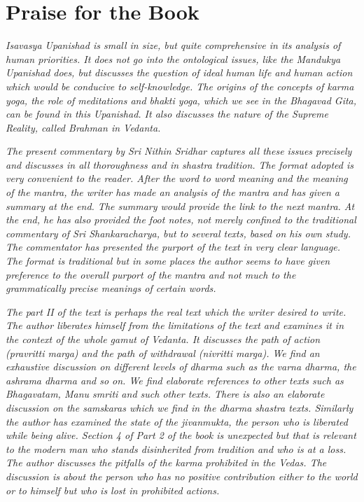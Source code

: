 \chapter{Praise for the Book}

\emph{Isavasya Upanishad is small in size, but quite comprehensive in its analysis of human priorities. It does not go into the ontological issues, like the Mandukya Upanishad does, but discusses the question of ideal human life and human action which would be conducive to self-knowledge. The origins of the concepts of karma yoga, the role of meditations and bhakti yoga, which we see in the Bhagavad Gita, can be found in this Upanishad. It also discusses the nature of the Supreme Reality, called Brahman in Vedanta.}

\emph{The present commentary by Sri Nithin Sridhar captures all these issues precisely and discusses in all thoroughness and in shastra tradition. The format adopted is very convenient to the reader. After the word to word meaning and the meaning of the mantra, the writer has made an analysis of the mantra and has given a summary at the end. The summary would provide the link to the next mantra. At the end, he has also provided the foot notes, not merely confined to the traditional commentary of Sri Shankaracharya, but to several texts, based on his own study. The commentator has presented the purport of the text in very clear language. The format is traditional but in some places the author seems to have given preference to the overall purport of the mantra and not much to the grammatically precise meanings of certain words.}

\emph{The part II of the text is perhaps the real text which the writer desired to write. The author liberates himself from the limitations of the text and examines it in the context of the whole gamut of Vedanta. It discusses the path of action (pravritti marga) and the path of withdrawal (nivritti marga). We find an exhaustive discussion on different levels of dharma such as the varna dharma, the ashrama dharma and so on. We find elaborate references to other texts such as Bhagavatam, Manu smriti and such other texts. There is also an elaborate discussion on the samskaras which we find in the dharma shastra texts. Similarly the author has examined the state of the jivanmukta, the person who is liberated while being alive. Section 4 of Part 2 of the book is unexpected but that is relevant to the modern man who stands disinherited from tradition and who is at a loss. The author discusses the pitfalls of the karma prohibited in the Vedas. The discussion is about the person who has no positive contribution either to the world or to himself but who is lost in prohibited actions.}

